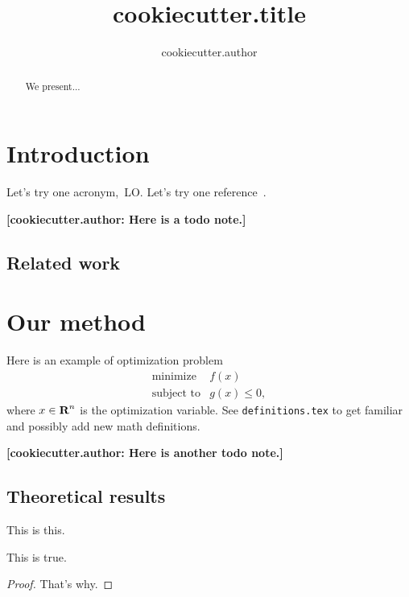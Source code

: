 \documentclass[12pt]{article}
\title{ {{cookiecutter.title}} }
\author{ {{cookiecutter.author}} }
\newcommand{\mynote}[1]{}
\renewcommand{\mynote}[1]{\textcolor{myblue}{\textbf{[{{cookiecutter.author}}: #1]}}}
\begin{document}
\maketitle

\begin{abstract}
We present...
\end{abstract}



\section{Introduction}

Let's try one acronym,~\gls{LO}. Let's try one reference~\cite{conforti2014}.

\mynote{Here is a todo note.}


\subsection{Related work}

\section{Our method}

Here is an example of optimization problem
\begin{equation*}
	\begin{array}{ll}
		\text{minimize} & f(x)\\
		\text{subject to} & g(x)\le 0,
	\end{array}
\end{equation*}
where $x \in {\mbox{\bf R}}^n$ is the optimization variable.
See {\tt definitions.tex} to get familiar and possibly add new math definitions.


\mynote{Here is another todo note.}

\subsection{Theoretical results}%
\label{sub:theoretical_results}


\begin{definition}
	This is this.
\end{definition}


\begin{theorem}
	This is true.
\end{theorem}
\begin{proof}
	That's why.
\end{proof}
\end{document}

